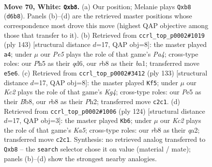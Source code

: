 \documentclass[11pt]{article}
\begin{document}
\clearpage

\begin{figure}[p]\centering
\begin{subfigure}{0.46\textwidth}\centering
\resizebox{\linewidth}{!}{%
\newchessgame
\chessboard[
  setfen={1r6/6P1/3Q4/4P2P/2k5/8/2K5/8 w - - 1 70},
  showmover=false,
  pgfstyle=straightmove, color=movearrow, markmove={d6-b8}
]}
\caption{}
\end{subfigure}\hfill
\begin{subfigure}{0.46\textwidth}\centering
\resizebox{\linewidth}{!}{%
\newchessgame
\chessboard[
  setfen={8/8/3Q4/p7/6k1/8/6K1/B3q3 b - - 7 72},
  showmover=false,
  pgfstyle=straightmove, color=movearrow, markmove={a5-a4}
]}
\caption{}
\end{subfigure}
\\[4pt]
\begin{subfigure}{0.46\textwidth}\centering
\resizebox{\linewidth}{!}{%
\newchessgame
\chessboard[
  setfen={1b6/8/8/6k1/3p4/5K2/7p/7R b - - 7 67},
  showmover=false,
  pgfstyle=straightmove, color=movearrow, markmove={g5-f5}
]}
\caption{}
\end{subfigure}\hfill
\begin{subfigure}{0.46\textwidth}\centering
\resizebox{\linewidth}{!}{%
\newchessgame
\chessboard[
  setfen={2Q5/1P2k2p/8/K7/8/8/q7/8 w - - 19 63},
  showmover=false,
  pgfstyle=straightmove, color=movearrow, markmove={a5-b6}
]}
\caption{}
\end{subfigure}
\caption{\textbf{Move 70, White: \texttt{Qxb8}.} (a) Our position; Melanie plays \texttt{Qxb8} (\texttt{d6b8}). Panels (b)--(d) are the retrieved master positions whose correspondence most drove this move (highest QAP objective among those that transfer to it). (b) Retrieved from \texttt{ccrl\_top\_p0002\#1019} (ply 143) [structural distance $d$=17, QAP obj=8]: the master played \texttt{a4}; under $\mu$ our \emph{Pe5} plays the role of that game's \emph{Pa4}; cross-type roles: our \emph{P}h5 as their \emph{q}d6, our \emph{r}b8 as their \emph{b}a1; transferred move \texttt{e5e6}. (c) Retrieved from \texttt{ccrl\_top\_p0002\#3412} (ply 133) [structural distance $d$=17, QAP obj=8]: the master played \texttt{Kf5}; under $\mu$ our \emph{Kc2} plays the role of that game's \emph{Kg4}; cross-type roles: our \emph{P}e5 as their \emph{B}b8, our \emph{r}b8 as their \emph{P}h2; transferred move \texttt{c2c1}. (d) Retrieved from \texttt{ccrl\_top\_p0002\#1006} (ply 124) [structural distance $d$=17, QAP obj=3]: the master played \texttt{Kb6}; under $\mu$ our \emph{Kc2} plays the role of that game's \emph{Ka5}; cross-type roles: our \emph{r}b8 as their \emph{q}a2; transferred move \texttt{c2c1}. Synthesis: no retrieved analog transferred to \texttt{Qxb8} -- the \texttt{search} selector chose it on value (material / mate); panels (b)--(d) show the strongest nearby analogies.}
\label{fig:thought-m138}
\end{figure}
\end{document}
